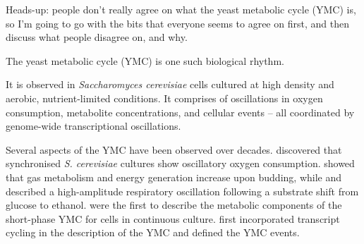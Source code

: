 Heads-up: people don't really agree on what the yeast metabolic cycle (YMC) is, so I'm going to go with the bits that everyone seems to agree on first, and then discuss what people disagree on, and why.


The yeast metabolic cycle (YMC) is one such biological rhythm.

It is observed in \emph{Saccharomyces cerevisiae} cells cultured at high density and aerobic,
nutrient-limited conditions.
It comprises of oscillations in oxygen consumption, metabolite concentrations, and cellular events -- all coordinated by genome-wide transcriptional oscillations.

Several aspects of the YMC have been observed over decades.
\citet{nosohSYNCHRONIZATIONBUDDINGCYCLE1962} discovered that synchronised \emph{S. cerevisiae} cultures show oscillatory oxygen consumption.
\citet{kasparvonmeyenburgEnergeticsBuddingCycle1969} showed that gas metabolism and energy generation increase upon budding, while and \citet{mochanRespiratoryOscillationsAdapting1973} described a high-amplitude respiratory oscillation following a substrate shift from glucose to ethanol.
\citet{satroutdinovOscillatoryMetabolismSaccharomyces1992} were the first to describe the metabolic components of the short-phase YMC for cells in continuous culture.
\citet{tuLogicYeastMetabolic2005} first incorporated transcript cycling in the description of the YMC and defined the YMC events.

